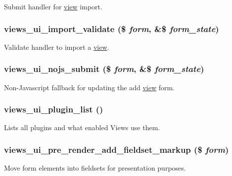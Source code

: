 \label{admin_8inc_af208375534e14a238da0f2979bd7c43e}
Submit handler for \hyperlink{classview}{view} import. \hypertarget{admin_8inc_ad5771e62497700de3986f6b03a5a3ab6}{
\subsubsection[{views\_\-ui\_\-import\_\-validate}]{\setlength{\rightskip}{0pt plus 5cm}views\_\-ui\_\-import\_\-validate (\$ {\em form}, \/  \&\$ {\em form\_\-state})}}
\label{admin_8inc_ad5771e62497700de3986f6b03a5a3ab6}
Validate handler to import a \hyperlink{classview}{view}. \hypertarget{admin_8inc_a1cfe16d961eb27f67d7a82b90e6ea397}{
\subsubsection[{views\_\-ui\_\-nojs\_\-submit}]{\setlength{\rightskip}{0pt plus 5cm}views\_\-ui\_\-nojs\_\-submit (\$ {\em form}, \/  \&\$ {\em form\_\-state})}}
\label{admin_8inc_a1cfe16d961eb27f67d7a82b90e6ea397}
Non-\/Javascript fallback for updating the add \hyperlink{classview}{view} form. \hypertarget{admin_8inc_a57ee9e613d22ff7c9a617f7e791e4e7e}{
\subsubsection[{views\_\-ui\_\-plugin\_\-list}]{\setlength{\rightskip}{0pt plus 5cm}views\_\-ui\_\-plugin\_\-list ()}}
\label{admin_8inc_a57ee9e613d22ff7c9a617f7e791e4e7e}
Lists all plugins and what enabled Views use them. \hypertarget{admin_8inc_a9a22d87a88a8d236a2695334870e5207}{
\subsubsection[{views\_\-ui\_\-pre\_\-render\_\-add\_\-fieldset\_\-markup}]{\setlength{\rightskip}{0pt plus 5cm}views\_\-ui\_\-pre\_\-render\_\-add\_\-fieldset\_\-markup (\$ {\em form})}}
\label{admin_8inc_a9a22d87a88a8d236a2695334870e5207}
Move form elements into fieldsets for presentation purposes.

